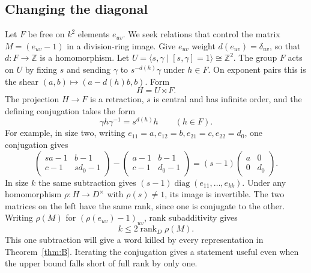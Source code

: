 \documentclass[11pt,a4paper]{article}
\numberwithin{equation}{section}
\DeclareMathOperator{\rk}{rank}
\DeclareMathOperator{\diag}{diag}
\newcommand{\Z}{\mathbb Z}
\begin{document}
\subsection{Changing the diagonal}
Let \(F\) be free on \(k^2\) elements \(e_{uv}\). We seek relations that control the matrix \(M=(e_{uv}-1)\) in a division-ring image. Give \(e_{uv}\) weight \(d(e_{uv})=\delta_{uv}\), so that \(d:F\to\Z\) is a homomorphism. Let \(U=\langle s,\gamma\mid [s,\gamma]=1\rangle\cong\Z^2\). The group \(F\) acts on \(U\) by fixing \(s\) and sending \(\gamma\) to \(s^{-d(h)}\gamma\) under \(h\in F\). On exponent pairs this is the shear \((a,b)\mapsto(a-d(h)b,b)\). Form
\begin{equation}\label{eq:semidirect}
                         H=U\rtimes F .
\end{equation}
The projection \(H\to F\) is a retraction, \(s\) is central and has infinite order, and the defining conjugation takes the form
\begin{equation}\label{eq:shear}
                    \gamma h\gamma^{-1}=s^{d(h)}h\qquad(h\in F).
\end{equation}
For example, in size two, writing \(e_{11}=a,e_{12}=b,e_{21}=c,e_{22}=d_0\), one conjugation gives
\[
\begin{pmatrix}sa-1&b-1\\c-1&sd_0-1\end{pmatrix}
-\begin{pmatrix}a-1&b-1\\c-1&d_0-1\end{pmatrix}
=(s-1)\begin{pmatrix}a&0\\0&d_0\end{pmatrix}.
\]
In size \(k\) the same subtraction gives \((s-1)\diag(e_{11},\ldots,e_{kk})\). Under any homomorphism \(\rho:H\to D^\times\) with \(\rho(s)\ne1\), its image is invertible. The two matrices on the left have the same rank, since one is conjugate to the other. Writing \(\rho(M)\) for \((\rho(e_{uv})-1)_{uv}\), rank subadditivity gives
\begin{equation}\label{eq:half}
                            k\le 2\rk_D\rho(M).
\end{equation}
This one subtraction will give a word killed by every representation in Theorem~\ref{thm:B}. Iterating the conjugation gives a statement useful even when the upper bound falls short of full rank by only one.
\end{document}
